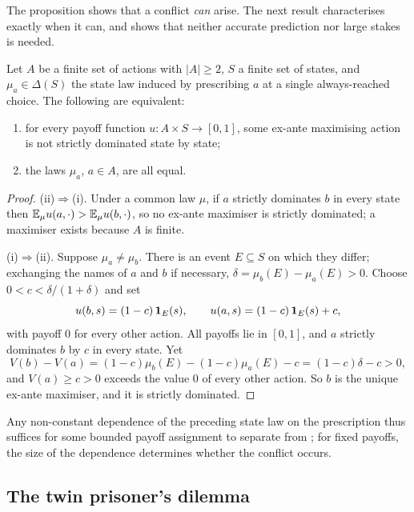 The proposition shows that a conflict \emph{can} arise. The next result characterises exactly when
it can, and shows that neither accurate prediction nor large stakes is needed.

\begin{theorem}\label{thm:characterisation}
Let $A$ be a finite set of actions with $|A|\ge2$, $S$ a finite set of states, and $\mu_a\in\Delta(S)$
the state law induced by prescribing $a$ at a single always-reached choice. The following are
equivalent:
\begin{enumerate}[label=(\roman*)]
  \item for every payoff function $u\colon A\times S\to[0,1]$, some ex-ante maximising action is not
        strictly dominated state by state;
  \item the laws $\mu_a$, $a\in A$, are all equal.
\end{enumerate}
\end{theorem}

\begin{proof}
(ii)$\Rightarrow$(i). Under a common law $\mu$, if $a$ strictly dominates $b$ in every state then
$\mathbb{E}_\mu u(a,\cdot)>\mathbb{E}_\mu u(b,\cdot)$, so no ex-ante maximiser is strictly dominated; a maximiser
exists because $A$ is finite.

(i)$\Rightarrow$(ii). Suppose $\mu_a\neq\mu_b$. There is an event $E\subseteq S$ on which they differ;
exchanging the names of $a$ and $b$ if necessary,
$\delta=\mu_b(E)-\mu_a(E)>0$. Choose $0<c<\delta/(1+\delta)$ and set
\[
  u(b,s)=(1-c)\,\mathbf{1}_E(s),\qquad u(a,s)=(1-c)\,\mathbf{1}_E(s)+c,
\]
with payoff $0$ for every other action. All payoffs lie in $[0,1]$, and $a$ strictly dominates $b$ by
$c$ in every state. Yet
\[
  V(b)-V(a)=(1-c)\mu_b(E)-(1-c)\mu_a(E)-c=(1-c)\delta-c>0,
\]
and $V(a)\ge c>0$ exceeds the value $0$ of every other action. So $b$ is the unique ex-ante
maximiser, and it is strictly dominated.
\end{proof}

Any non-constant dependence of the preceding state law on the prescription thus suffices for some
bounded payoff assignment to separate  from ; for fixed payoffs, the size of the
dependence determines whether the conflict occurs.

\subsection{The twin prisoner's dilemma}\label{sec:twin}


